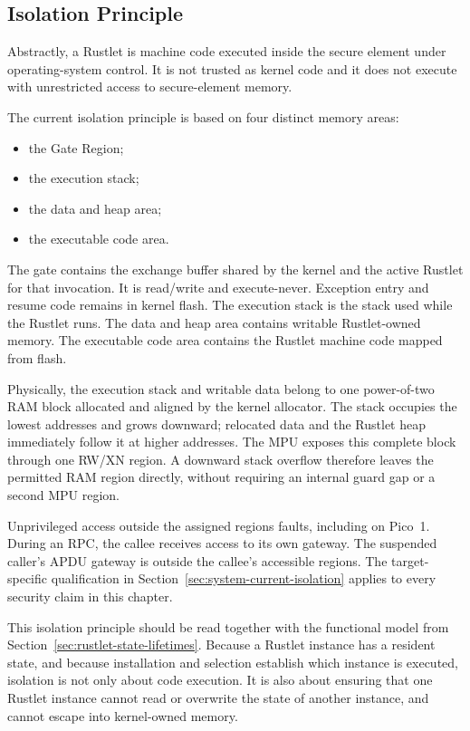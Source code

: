 \subsection{Isolation Principle}

Abstractly, a Rustlet is machine code executed inside the secure element
under operating-system control. It is not trusted as kernel code and it
does not execute with unrestricted access to secure-element memory.

The current isolation principle is based on four distinct memory areas:
\begin{itemize}
\item the Gate Region;
\item the execution stack;
\item the data and heap area;
\item the executable code area.
\end{itemize}

The gate contains the exchange buffer shared by the kernel and the active
Rustlet for that invocation. It is
read/write and execute-never. Exception entry and resume code remains in
kernel flash.
The execution stack is the stack used while the Rustlet runs. The data
and heap area contains writable Rustlet-owned memory. The executable
code area contains the Rustlet machine code mapped from flash.

Physically, the execution stack and writable data belong to one
power-of-two RAM block allocated and aligned by the kernel allocator.
The stack occupies the lowest addresses and grows downward; relocated
data and the Rustlet heap immediately follow it at higher addresses.
The MPU exposes this complete block through one
RW/XN region. A downward stack overflow therefore leaves the permitted RAM
region directly, without requiring an internal guard gap or a second MPU
region.

Unprivileged access outside the assigned regions faults, including on
Pico~1. During an RPC,
the callee receives access to its own gateway. The suspended caller's APDU
gateway is outside the callee's accessible regions. The target-specific qualification in
Section~\ref{sec:system-current-isolation} applies to every security claim
in this chapter.

This isolation principle should be read together with the functional
model from Section~\ref{sec:rustlet-state-lifetimes}. Because a Rustlet instance has a resident state,
and because installation and selection establish which instance is
executed, isolation is not only about code execution. It is also about
ensuring that one Rustlet instance cannot read or overwrite the state of
another instance, and cannot escape into kernel-owned memory.

